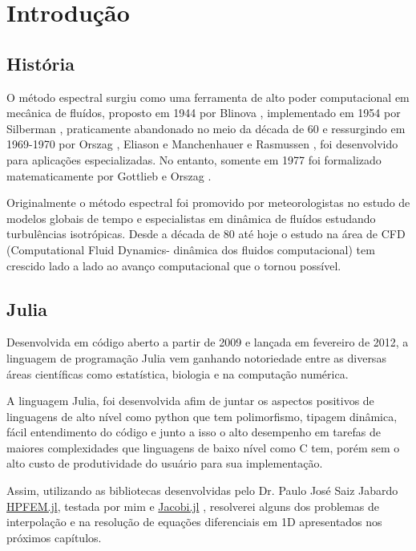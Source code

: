 \chapter{Introdução}
\label{cap:introducao}
\section{História}
O método espectral surgiu como uma ferramenta de alto poder computacional em mecânica de fluídos, proposto em 1944 por Blinova \cite{blinova1944}, implementado em 1954 por Silberman \cite{silberman}, praticamente abandonado no meio da década de 60 e ressurgindo em 1969-1970 por Orszag \cite{Orszag70}, Eliason e Manchenhauer  e Rasmussen \cite{eliasenauermussen}, foi desenvolvido para aplicações especializadas. No entanto,  somente em 1977 foi formalizado matematicamente por Gottlieb e Orszag \cite{Orslieb77}.

Originalmente o método espectral foi promovido por meteorologistas no estudo de modelos globais de tempo e especialistas em dinâmica de fluídos estudando turbulências isotrópicas. Desde a década de 80 até hoje o  estudo na área de CFD (Computational Fluid Dynamics- dinâmica dos fluidos computacional) tem crescido lado a lado ao avanço computacional que o tornou possível.
\section{Julia}
Desenvolvida em código aberto a partir de 2009 e lançada em fevereiro de 2012, a linguagem de programação Julia vem ganhando notoriedade entre as diversas áreas científicas como estatística, biologia e na computação numérica.

A linguagem Julia, foi desenvolvida afim de juntar os aspectos positivos de linguagens de alto nível como python que tem polimorfismo, tipagem dinâmica, fácil entendimento do código e junto a isso o alto desempenho em tarefas de maiores complexidades que linguagens de baixo nível como C tem, porém sem o  alto custo de produtividade do usuário para sua implementação.

Assim, utilizando as bibliotecas desenvolvidas pelo  Dr. Paulo José Saiz Jabardo \href{www.github.com/pjabardo/HPFEM.jl}{HPFEM.jl}, testada por mim e \href{www.github.com/pjabardo/Jacobi.jl}{Jacobi.jl} , resolverei alguns dos problemas de interpolação e na resolução de equações diferenciais em 1D apresentados nos próximos capítulos.

